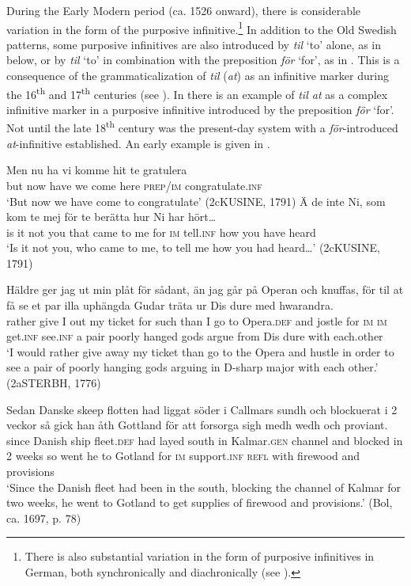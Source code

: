 \documentclass[output=paper]{langscibook}
\begin{document}
During the Early Modern period (ca. 1526 onward), there is considerable variation in the form of the purposive infinitive.\footnote{There is also substantial variation in the form of purposive infinitives in German, both synchronically and diachronically (see \citealt{Demske2011}).}  In addition to the Old Swedish patterns, some purposive infinitives are also introduced by \textit{til} ‘to’ alone, as in  below, or by \textit{til} ‘to’ in combination with the preposition \textit{för} ‘for’, as in . This is a consequence of the grammaticalization of \textit{til} (\textit{at}) as an infinitive marker during the 16\textsuperscript{th} and 17\textsuperscript{th} centuries (see \cites[]{Kalm2014}[]{Kalm2016Prepositioner}[203–221]{Kalm2016Satsekvivalenta}). In  there is an example of \textit{til at} as a complex infinitive marker in a purposive infinitive introduced by the preposition \textit{för} ‘for’. Not until the late 18\textsuperscript{th} century was the present-day system with a \textit{för}{}-introduced \textit{at}{}-infinitive established. An early example is given in . 


\ea
\label{ex:kalm:11}
\ea  \label{ex:kalm:11a}
\gll Men nu ha vi komme hit te gratulera\\
but now have we come here \textsc{prep}/\textsc{im} congratulate.\textsc{inf}\\
\glt ‘But now we have come to congratulate’ (2cKUSINE, 1791) 
\ex  \label{ex:kalm:11b}
\gll Ä de inte Ni, som kom te mej för te berätta hur Ni har hört…\\
is it not you that came to me for \textsc{im} tell.\textsc{inf} how you have heard\\
\glt ‘Is it not you, who came to me, to tell me how you had heard…’ (2cKUSINE, 1791)

\ex  \label{ex:kalm:11c}
\gll Häldre ger jag ut min plåt för sådant, än jag går på Operan och knuffas, för til at få se et par illa uphängda Gudar träta ur Dis dure med hwarandra.\\
rather give I out my ticket for such than I go to Opera.\textsc{def} and jostle for \textsc{im} \textsc{im} get.\textsc{inf} see.\textsc{inf} a pair poorly hanged gods argue from Dis dure with each.other\\
\glt ‘I would rather give away my ticket than go to the Opera and hustle in order to see a pair of poorly hanging gods arguing in D-sharp major with each other.’ (2aSTERBH, 1776)

\ex \label{ex:kalm:11d}
\gll Sedan Danske skeep flotten had liggat söder i Callmars sundh och blockuerat i 2 veckor så gick han åth Gottland för att forsorga sigh medh wedh och proviant.\\
since Danish ship fleet.\textsc{def} had layed south in Kalmar.\textsc{gen} channel and blocked in 2 weeks so went he to Gotland for \textsc{im} support.\textsc{inf} \textsc{refl} with firewood and provisions\\ 
\glt ‘Since the Danish fleet had been in the south, blocking the channel of Kalmar for two weeks, he went to Gotland to get supplies of firewood and provisions.’ (Bol, ca. 1697, p. 78)
\z 
\z 
\end{document}
